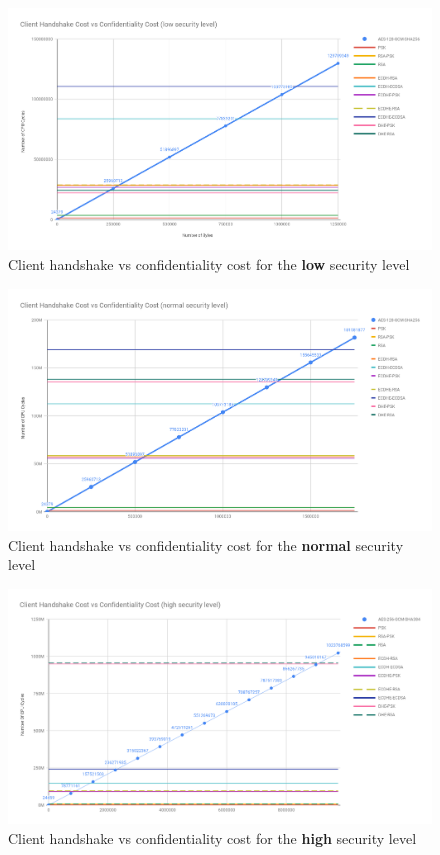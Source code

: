 \documentclass{llncs}
\begin{document}
\begin{figure}
  \centering
  \includegraphics[width=1.0\textwidth]{img/cli_conf_hs_low.png}
  \centering \caption{\label{fig:cli-conf-hs-low} Client handshake vs confidentiality cost for the \textbf{low} security level}
\end{figure}

\begin{figure}
  \centering
  \includegraphics[width=1.0\textwidth]{img/cli_conf_hs_normal.png}
  \centering \caption{\label{fig:cli-conf-hs-normal} Client handshake vs confidentiality cost for the \textbf{normal} security level}
\end{figure}

\begin{figure}
  \centering
  \includegraphics[width=1.0\textwidth]{img/cli_conf_hs_high.png}
  \centering \caption{\label{fig:cli-conf-hs-high} Client handshake vs confidentiality cost for the \textbf{high} security level}
\end{figure}
\end{document}
